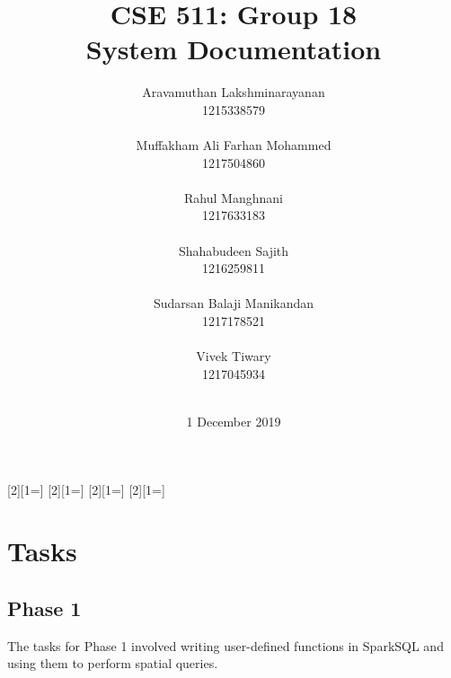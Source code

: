 \usepackage[colorinlistoftodos,prependcaption,textsize=footnotesize]{todonotes}
[2][1=]{\textcolor{Red}
{}}
[2][1=]{\textcolor{Blue}
{}}
[2][1=]{\textcolor{OliveGreen}{}}
[2][1=]{\textcolor{Plum}{}}





\title{
{\Huge CSE 511: Group 18{\large\linebreak\\} System Documentation{\large\linebreak\\}}
}
\author{
Aravamuthan Lakshminarayanan\\
1215338579\\\\
Muffakham Ali Farhan Mohammed\\
1217504860\\\\
Rahul Manghnani\\
1217633183\\\\
Shahabudeen Sajith\\
1216259811\\\\
Sudarsan Balaji Manikandan\\
1217178521\\\\
Vivek Tiwary\\
1217045934\\\\
}
\date{1 December 2019}
\maketitle
\newpage


\tableofcontents\label{c}
\newpage

\section{Tasks} \label{Tasks}
	\subsection{Phase 1} \label{Phase 1}
    The tasks for Phase 1 involved writing user-defined functions in SparkSQL and using them to perform spatial queries.\\

